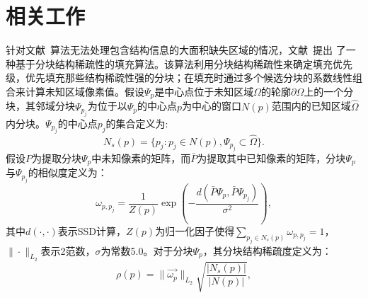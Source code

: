  \section{相关工作}
 \label{ch3:sec:related}
针对文献~算法无法处理包含结构信息的大面积缺失区域的情况，文献~提出 了一种基于分块结构稀疏性的填充算法。该算法利用分块结构稀疏性来确定填充优先级，优先填充那些结构稀疏性强的分块；在填充时通过多个候选分块的系数线性组合来计算未知区域像素值。假设$\Psi_p$是中心点位于未知区域$\Omega$的轮廓$\partial\Omega$上的一个分块，其邻域分块$\Psi_{p_{j}}$为位于以$\Psi_p$的中心点$p$为中心的窗口$N(p)$范围内的已知区域$\hat{\Omega}$内分块。$\Psi_{p_{j}}$的中心点$p_j$的集合定义为:
$$N_s(p)=\{p_j:p_j \in N(p) , \Psi_{p_{j}} \subset \hat{\Omega}\}.$$
假设$P$为提取分块$\Psi_p$中未知像素的矩阵，而$\bar{P}$为提取其中已知像素的矩阵，分块$\Psi_p$与$\Psi_{p_j}$的相似度定义为：
$$\omega_{p,p_j}=\frac{1}{Z(p)}\exp(-\frac{d(\bar{P}\Psi_p,\bar{P}\Psi_{p_j})}{\sigma^2}),$$
其中$d(\cdot,\cdot)$表示SSD计算，$Z(p)$为归一化因子使得$\sum_{p_j \in N_s(p)}\omega_{p,p_j} = 1$，$\|\cdot\|_{L_2}$表示2范数，$\sigma$为常数5.0。对于分块$\Psi_p$，其分块结构稀疏度定义为：
\begin{equation}
\label{ch3:equ:sparsity}
\rho(p)=\|\vec{\omega_p}\|_{L_2}\sqrt{\frac{|N_s(p)|}{|N(p)|}},
\end{equation}

